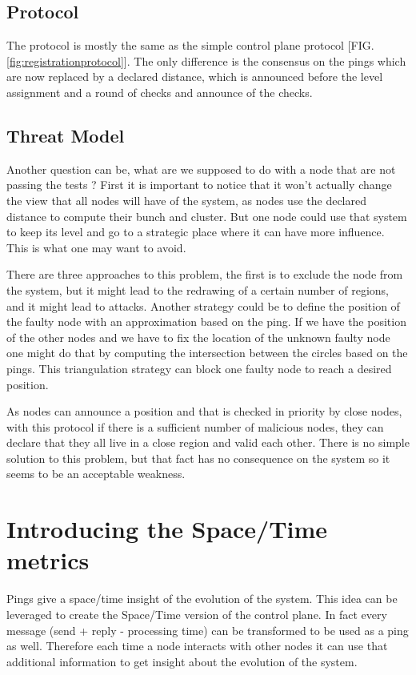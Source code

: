 \documentclass[a4paper,11pt,oneside]{report}
\begin{document}
\subsection{Protocol}
The protocol is mostly the same as the simple control plane protocol [FIG.
\ref{fig:registrationprotocol}]. The only difference is the consensus on the
pings which are now replaced by a declared distance, which is announced before
the level assignment and a round of checks and announce of the checks. 

\subsection{Threat Model}
Another question can be, what are we supposed to do with a node that are not
passing the tests ? First it is important to notice that it won't actually
change the view that all nodes will have of the system, as nodes use the
declared distance to compute their bunch and cluster. But one node could use
that system to keep its level and go to a strategic place where it can have
more influence. This is what one may want to avoid. 

There are three approaches to this problem, the first is to exclude the node
from the system, but it might lead to the redrawing of a certain number of
regions, and it might lead to attacks. Another strategy could be to define the
position of the faulty node with an approximation based on the ping. If we have
the position of the other nodes and we have to fix the location of the unknown
faulty node one might do that by computing the intersection between the circles
based on the pings. This triangulation strategy can block one faulty node to
reach a desired position. 

As nodes can announce a position and that is checked in priority by close
nodes, with this protocol if there is a sufficient number of malicious nodes,
they can declare that they all live in a close region and valid each other.
There is no simple solution to this problem, but that fact has no consequence
on the system so it seems to be an acceptable weakness.

\section{Introducing the Space/Time metrics}

Pings give a space/time insight of the evolution of the system.  This idea can
be leveraged to create the Space/Time version of the control plane. In fact
every message (send + reply - processing time) can be transformed to be used as
a ping as well. Therefore each time a node interacts with other nodes it can
use that additional information to get insight about the evolution of the
system. 
\end{document}
